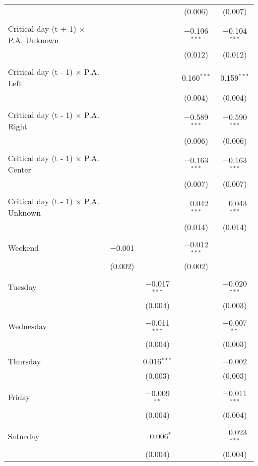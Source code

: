 \documentclass[
]{article}
\begin{document}
\begin{table}[!htbp]
{\begin{tabular}{@{\extracolsep{5pt}}lcccc}
  &  &  & (0.006) & (0.007) \\ 
  & & & & \\ 
 Critical day (t + 1) $\times$ P.A. Unknown &  &  & $-$0.106$^{***}$ & $-$0.104$^{***}$ \\ 
  &  &  & (0.012) & (0.012) \\ 
  & & & & \\ 
 Critical day (t - 1) $\times$ P.A. Left &  &  & 0.160$^{***}$ & 0.159$^{***}$ \\ 
  &  &  & (0.004) & (0.004) \\ 
  & & & & \\ 
 Critical day (t - 1) $\times$ P.A. Right &  &  & $-$0.589$^{***}$ & $-$0.590$^{***}$ \\ 
  &  &  & (0.006) & (0.006) \\ 
  & & & & \\ 
 Critical day (t - 1) $\times$ P.A. Center &  &  & $-$0.163$^{***}$ & $-$0.163$^{***}$ \\ 
  &  &  & (0.007) & (0.007) \\ 
  & & & & \\ 
 Critical day (t - 1) $\times$ P.A. Unknown &  &  & $-$0.042$^{***}$ & $-$0.043$^{***}$ \\ 
  &  &  & (0.014) & (0.014) \\ 
  & & & & \\ 
 Weekend & $-$0.001 &  & $-$0.012$^{***}$ &  \\ 
  & (0.002) &  & (0.002) &  \\ 
  & & & & \\ 
 Tuesday &  & $-$0.017$^{***}$ &  & $-$0.020$^{***}$ \\ 
  &  & (0.004) &  & (0.003) \\ 
  & & & & \\ 
 Wednesday &  & $-$0.011$^{***}$ &  & $-$0.007$^{**}$ \\ 
  &  & (0.004) &  & (0.003) \\ 
  & & & & \\ 
 Thursday &  & 0.016$^{***}$ &  & $-$0.002 \\ 
  &  & (0.003) &  & (0.003) \\ 
  & & & & \\ 
 Friday &  & $-$0.009$^{**}$ &  & $-$0.011$^{***}$ \\ 
  &  & (0.004) &  & (0.004) \\ 
  & & & & \\ 
 Saturday &  & $-$0.006$^{*}$ &  & $-$0.023$^{***}$ \\ 
  &  & (0.004) &  & (0.004) \\ 

\end{tabular}}
\end{table}
\end{document}
